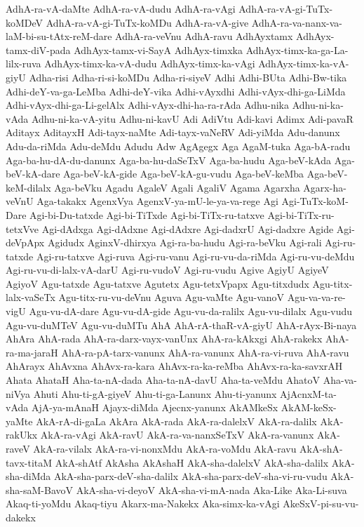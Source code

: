 {AdhA-ra-vA-daMte
AdhA-ra-vA-dudu
AdhA-ra-vAgi
AdhA-ra-vA-gi-TuTx-koMDeV
AdhA-ra-vA-gi-TuTx-koMDu
AdhA-ra-vA-give
AdhA-ra-va-nanx-va-laM-bi-su-tAtx-reM-dare
AdhA-ra-veVnu
AdhA-ravu
AdhAyxtamx
AdhAyx-tamx-diV-pada
AdhAyx-tamx-vi-SayA
AdhAyx-timxka
AdhAyx-timx-ka-ga-La-lilx-ruva
AdhAyx-timx-ka-vA-dudu
AdhAyx-timx-ka-vAgi
AdhAyx-timx-ka-vA-giyU
Adha-risi
Adha-ri-si-koMDu
Adha-ri-siyeV
Adhi
Adhi-BUta
Adhi-Bw-tika
Adhi-deY-va-ga-LeMba
Adhi-deY-vika
Adhi-vAyxdhi
Adhi-vAyx-dhi-ga-LiMda
Adhi-vAyx-dhi-ga-Li-gelAlx
Adhi-vAyx-dhi-ha-ra-rAda
Adhu-nika
Adhu-ni-ka-vAda
Adhu-ni-ka-vA-yitu
Adhu-ni-kavU
Adi
AdiVtu
Adi-kavi
Adimx
Adi-pavaR
Aditayx
AditayxH
Adi-tayx-naMte
Adi-tayx-vaNeRV
Adi-yiMda
Adu-danunx
Adu-da-riMda
Adu-deMdu
Adudu
Adw
AgAgegx
Aga
AgaM-tuka
Aga-bA-radu
Aga-ba-hu-dA-du-danunx
Aga-ba-hu-daSeTxV
Aga-ba-hudu
Aga-beV-kAda
Aga-beV-kA-dare
Aga-beV-kA-gide
Aga-beV-kA-gu-vudu
Aga-beV-keMba
Aga-beV-keM-dilalx
Aga-beVku
Agadu
AgaleV
Agali
AgaliV
Agama
Agarxha
Agarx-ha-veVnU
Aga-takakx
AgenxVya
AgenxV-ya-mU-le-ya-va-rege
Agi
Agi-TuTx-koM-Dare
Agi-bi-Du-tatxde
Agi-bi-TiTxde
Agi-bi-TiTx-ru-tatxve
Agi-bi-TiTx-ru-tetxVve
Agi-dAdxga
Agi-dAdxne
Agi-dAdxre
Agi-dadxrU
Agi-dadxre
Agide
Agi-deVpApx
Agidudx
AginxV-dhirxya
Agi-ra-ba-hudu
Agi-ra-beVku
Agi-rali
Agi-ru-tatxde
Agi-ru-tatxve
Agi-ruva
Agi-ru-vanu
Agi-ru-vu-da-riMda
Agi-ru-vu-deMdu
Agi-ru-vu-di-lalx-vA-darU
Agi-ru-vudoV
Agi-ru-vudu
Agive
AgiyU
AgiyeV
AgiyoV
Agu-tatxde
Agu-tatxve
Agutetx
Agu-tetxVpapx
Agu-titxdudx
Agu-titx-lalx-vaSeTx
Agu-titx-ru-vu-deVnu
Aguva
Agu-vaMte
Agu-vanoV
Agu-va-va-re-vigU
Agu-vu-dA-dare
Agu-vu-dA-gide
Agu-vu-da-ralilx
Agu-vu-dilalx
Agu-vudu
Agu-vu-duMTeV
Agu-vu-duMTu
AhA
AhA-rA-thaR-vA-giyU
AhA-rAyx-Bi-naya
AhAra
AhA-rada
AhA-ra-darx-vayx-vanUnx
AhA-ra-kAkxgi
AhA-rakekx
AhA-ra-ma-jaraH
AhA-ra-pA-tarx-vanunx
AhA-ra-vanunx
AhA-ra-vi-ruva
AhA-ravu
AhArayx
AhAvxna
AhAvx-ra-kara
AhAvx-ra-ka-reMba
AhAvx-ra-ka-savxrAH
Ahata
AhataH
Aha-ta-nA-dada
Aha-ta-nA-davU
Aha-ta-veMdu
AhatoV
Aha-va-niVya
Ahuti
Ahu-ti-gA-giyeV
Ahu-ti-ga-Lanunx
Ahu-ti-yanunx
AjAcnxM-ta-vAda
AjA-ya-mAnaH
Ajayx-diMda
Ajecnx-yanunx
AkAMkeSx
AkAM-keSx-yaMte
AkA-rA-di-gaLa
AkAra
AkA-rada
AkA-ra-dalelxV
AkA-ra-dalilx
AkA-rakUkx
AkA-ra-vAgi
AkA-ravU
AkA-ra-va-nanxSeTxV
AkA-ra-vanunx
AkA-raveV
AkA-ra-vilalx
AkA-ra-vi-nonxMdu
AkA-ra-voMdu
AkA-ravu
AkA-shA-tavx-titaM
AkA-shAtf
AkAsha
AkAshaH
AkA-sha-dalelxV
AkA-sha-dalilx
AkA-sha-diMda
AkA-sha-parx-deV-sha-dalilx
AkA-sha-parx-deV-sha-vi-ru-vudu
AkA-sha-saM-BavoV
AkA-sha-vi-deyoV
AkA-sha-vi-mA-nada
Aka-Like
Aka-Li-suva
Akaq-ti-yoMdu
Akaq-tiyu
Akarx-ma-Nakekx
Aka-simx-ka-vAgi
AkeSxV-pi-su-vu-dakekx
}
